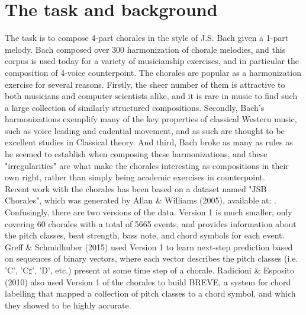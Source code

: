 \documentclass[12pt]{article}
\begin{document}
\maketitle


\section{The task and background}

The task is to compose 4-part chorales in the style of J.S. Bach given a 1-part melody. Bach composed over 300 harmonization of chorale melodies, and this corpus is used today for a variety of musicianship exercises, and in particular the composition of 4-voice counterpoint. The chorales are popular as a harmonization exercise for several reasons. Firstly, the sheer number of them is attractive to both musicians and computer scientists alike, and it is rare in music to find such a large collection of similarly structured compositions. Secondly, Bach's harmonizations exemplify many of the key properties of classical Western music, such as voice leading and cadential movement, and as such are thought to be excellent studies in Classical theory. And third, Bach broke as many as rules as he seemed to establish when composing these harmonizations, and these "irregularities" are what make the chorales interesting as compositions in their own right, rather than simply being academic exercises in counterpoint. \\

Recent work with the chorales has been based on a dataset named "JSB Chorales", which was generated by Allan \& Williams (2005), available at: \JSBChorales. Confusingly, there are two versions of the data. Version 1 is much smaller, only covering 60 chorales with a total of 5665 events, and provides information about the pitch classes, beat strength, bass note, and chord symbols for each event. Greff \& Schmidhuber (2015) used Version 1 to learn next-step prediction based on sequences of binary vectors, where each vector describes the pitch classes (i.e. 'C', 'C$\sharp$', 'D', etc.) present at some time step of a chorale. Radicioni \& Esposito (2010) also used Version 1 of the chorales to build BREVE, a system for chord labelling that mapped a collection of pitch classes to a chord symbol, and which they showed to be highly accurate.\\
\end{document}
